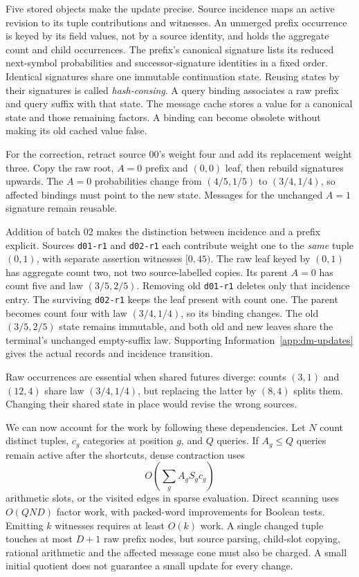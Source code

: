 \documentclass[reprint,aps,prx,superscriptaddress,nofootinbib,longbibliography]{revtex4-2}
\begin{document}
Five stored objects make the update precise.
Source incidence maps an active revision to its tuple contributions and witnesses.
An unmerged prefix occurrence is keyed by its field values, not by a source identity, and holds the aggregate count and child occurrences.
The prefix's canonical signature lists its reduced next-symbol probabilities and successor-signature identities in a fixed order.
Identical signatures share one immutable continuation state.
Reusing states by their signatures is called \emph{hash-consing}.
A query binding associates a raw prefix and query suffix with that state.
The message cache stores a value for a canonical state and those remaining factors.
A binding can become obsolete without making its old cached value false.

For the correction, retract source 00's weight four and add its replacement weight three.
Copy the raw root, \(A=0\) prefix and \((0,0)\) leaf, then rebuild signatures upwards.
The \(A=0\) probabilities change from \((4/5,1/5)\) to \((3/4,1/4)\), so affected bindings must point to the new state.
Messages for the unchanged \(A=1\) signature remain reusable.

Addition of batch 02 makes the distinction between incidence and a prefix explicit.
Sources \texttt{d01-r1} and \texttt{d02-r1} each contribute weight one to the \emph{same} tuple \((0,1)\), with separate assertion witnesses \([0,45)\).
The raw leaf keyed by \((0,1)\) has aggregate count two, not two source-labelled copies.
Its parent \(A=0\) has count five and law \((3/5,2/5)\).
Removing old \texttt{d01-r1} deletes only that incidence entry.
The surviving \texttt{d02-r1} keeps the leaf present with count one.
The parent becomes count four with law \((3/4,1/4)\), so its binding changes.
The old \((3/5,2/5)\) state remains immutable, and both old and new leaves share the terminal's unchanged empty-suffix law.
Supporting Information~\ref{app:dm-updates} gives the actual records and incidence transition.

Raw occurrences are essential when shared futures diverge: counts \((3,1)\) and \((12,4)\) share law \((3/4,1/4)\), but replacing the latter by \((8,4)\) splits them.
Changing their shared state in place would revise the wrong sources.

We can now account for the work by following these dependencies.
Let \(N\) count distinct tuples, \(c_g\) categories at position \(g\), and \(Q\) queries.
If \(A_g\leq Q\) queries remain active after the shortcuts, dense contraction uses
\begin{equation}
 O\!\left(\sum_g A_gS_gc_g\right)
 \label{eq:querycost}
\end{equation}
arithmetic slots, or the visited edges in sparse evaluation.
Direct scanning uses \(O(QND)\) factor work, with packed-word improvements for Boolean tests.
Emitting \(k\) witnesses requires at least \(O(k)\) work.
A single changed tuple touches at most \(D+1\) raw prefix nodes, but source parsing, child-slot copying, rational arithmetic and the affected message cone must also be charged.
A small initial quotient does not guarantee a small update for every change.
\end{document}
